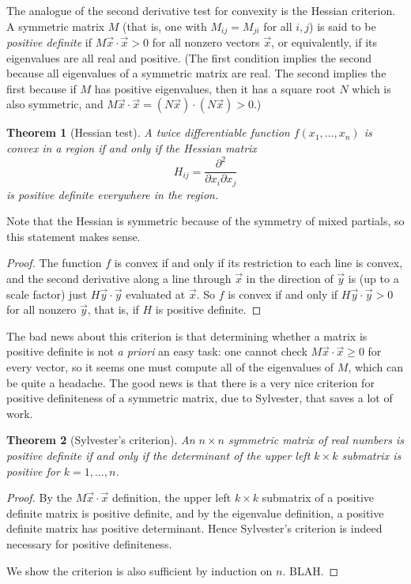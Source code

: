 \documentclass[12pt]{report}
\newtheorem{theorem}{Theorem}
\def\vx{\vec{x}}
\def\vy{\vec{y}}
\numberwithin{exc}{section}
\begin{document}
The analogue of the second derivative test for convexity is the 
Hessian criterion. A symmetric matrix $M$ (that is, one with 
$M_{ij} = M_{ji}$ for all $i,j$) is said to be \emph{positive definite} 
if $M\vx \cdot \vx > 0$ for all nonzero vectors $\vx$, or equivalently, if 
its eigenvalues are all real and positive. (The first condition 
implies the second because all eigenvalues of a symmetric matrix are 
real. The second implies the first because if $M$ has positive 
eigenvalues, then it has a square root $N$ which is also symmetric, 
and $M\vx \cdot \vx = (N\vx) \cdot (N\vx) > 0$.)
\begin{theorem}[Hessian test]
A twice differentiable function $f(x_1, \dots, x_n)$ is convex in a 
region if and only if the Hessian matrix
\[
H_{ij} = \frac{\partial^2}{\partial x_i \partial x_j}
\]
is positive definite everywhere in the region.
\end{theorem}
Note that the Hessian is symmetric because of the symmetry of mixed 
partials, so this statement makes sense.
\begin{proof}
The function $f$ is convex if and only if its restriction to each line 
is convex, and the second derivative along a line through $\vx$ in the 
direction of $\vy$ is (up to a scale factor) just $H \vy \cdot \vy$ 
evaluated at $\vx$. So $f$ is convex if and only if $H \vy \cdot \vy 
>0$ for all nonzero $\vy$, that is, if $H$ is positive definite.
\end{proof}

The bad news about this criterion is that determining whether a 
matrix is positive definite is not \emph{a priori} an easy task: one 
cannot check $M\vx \cdot \vx \geq 0$ for every vector, so it seems 
one must compute all of the eigenvalues of $M$, which can be quite a 
headache. The good news is that
there is a very nice criterion for positive definiteness of a 
symmetric matrix, due to Sylvester, that saves a lot of work.
\begin{theorem}[Sylvester's criterion]
An $n \times n$ symmetric matrix of real numbers is positive definite if and only 
if the determinant of the upper left $k \times k$ submatrix is 
positive for $k = 1, \dots, n$.
\end{theorem}
\begin{proof}
By the $M \vx \cdot \vx$ definition, the upper 
left $k \times k$ submatrix of a positive definite matrix is positive 
definite, and by the eigenvalue definition, a positive definite matrix 
has positive determinant. Hence Sylvester's criterion is indeed 
necessary for positive definiteness.

We show the criterion is also sufficient by induction on $n$. BLAH.
\end{proof}
\end{document}
